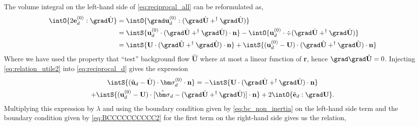 The volume integral on the left-hand side of \ref{eq:reciprocal_all} can be reformulated as,
\begin{align}
    \intO{ 2\textbf{e}_d^{(0)} : \grad \hat{\textbf{U}} }
    &=\intO{ \grad \textbf{u}_d^{(0)} : (\grad \hat{\textbf{U}} +^\dagger \grad \hat{\textbf{U}}) }\\
    &=
    \intS{  \textbf{u}_d^{(0)} \cdot (\grad \hat{\textbf{U}} + ^\dagger\grad \hat{\textbf{U}})  \cdot \textbf{n}}
    - \intO{  \textbf{u}_d^{(0)} \cdot \div(\grad \hat{\textbf{U}} + ^\dagger\grad \hat{\textbf{U}})}
    \label{eq:relation_utile}
    \\
    &=
    \intS{  \textbf{U} \cdot (\grad \hat{\textbf{U}} + ^\dagger\grad \hat{\textbf{U}})  \cdot \textbf{n}}
    + \intS{  (\textbf{u}_d^{(0)} - \textbf{U})\cdot (\grad \hat{\textbf{U}} + ^\dagger\grad \hat{\textbf{U}})  \cdot \textbf{n}}
    \label{eq:relation_utile2}
\end{align}
Where we have used the property that ``test'' background flow $\hat{\textbf{U}}$ where at most a linear function of \textbf{r}, hence $\grad\grad \hat{\textbf{U}} = 0$. 
Injecting \ref{eq:relation_utile2} into \ref{eq:reciprocal_d} gives the expression
\begin{multline}
    \intS{(\hat{\textbf{u}}_d - \hat{\textbf{U}})\cdot \bm\sigma_d^{(0)} \cdot \textbf{n}}
    =
    - \intS{  \textbf{U} \cdot (\grad \hat{\textbf{U}} + ^\dagger\grad \hat{\textbf{U}})  \cdot \textbf{n}}\\
    + \intS{(\textbf{u}_d^{(0)} - \textbf{U}) \cdot  [\hat{\bm\sigma}_d -(\grad \hat{\textbf{U}} + ^\dagger\grad \hat{\textbf{U}})]\cdot \textbf{n} }
    + 2\intO{\hat{\textbf{e}}_d : \grad \textbf{U}}. 
\end{multline}
Multiplying this expression by $\lambda$ and using the boundary condition given by \ref{eq:bc_non_inertia} on the left-hand side term and the boundary condition given by \ref{eq:BCCCCCCCCCC2} for the first term on the right-hand side gives us the relation,
